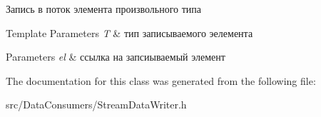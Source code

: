 Запись в поток элемента произвольного типа 


\begin{DoxyTemplParams}{Template Parameters}
{\em T} & тип записываемого эелемента \\
\hline
\end{DoxyTemplParams}

\begin{DoxyParams}{Parameters}
{\em el} & ссылка на запсиываемый элемент \\
\hline
\end{DoxyParams}


The documentation for this class was generated from the following file\+:\begin{DoxyCompactItemize}
\item 
src/\+Data\+Consumers/Stream\+Data\+Writer.\+h\end{DoxyCompactItemize}
